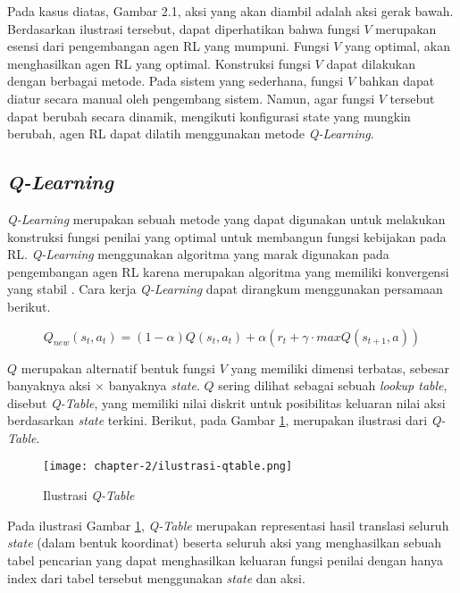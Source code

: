 Pada kasus diatas, Gambar 2.1, aksi yang akan diambil adalah aksi gerak bawah. Berdasarkan ilustrasi tersebut, dapat diperhatikan bahwa fungsi \(V\) merupakan esensi dari pengembangan agen \ac{RL} yang mumpuni. Fungsi \(V\) yang optimal, akan menghasilkan agen \ac{RL} yang optimal. Konstruksi fungsi \(V\) dapat dilakukan dengan berbagai metode. Pada sistem yang sederhana, fungsi \(V\) bahkan dapat diatur secara manual oleh pengembang sistem. Namun, agar fungsi \(V\) tersebut dapat berubah secara dinamik, mengikuti konfigurasi state yang mungkin berubah, agen \ac{RL} dapat dilatih menggunakan metode \textit{Q-Learning}.

\subsection{\textit{Q-Learning}}
\textit{Q-Learning} merupakan sebuah metode yang dapat digunakan untuk melakukan konstruksi fungsi penilai yang optimal untuk membangun fungsi kebijakan pada \ac{RL}. \textit{Q-Learning} menggunakan algoritma yang marak digunakan pada pengembangan agen \ac{RL} karena merupakan algoritma yang memiliki konvergensi yang stabil \parencite{lim2022regularized}. Cara kerja \textit{Q-Learning} dapat dirangkum menggunakan persamaan berikut.

\begin{equation}
	\label{eq:q-learning}
	Q_{new}(s_t,a_t) = (1-\alpha) Q(s_t, a_t) + \alpha (r_t + \gamma \cdot maxQ(s_{t+1},a))
\end{equation}

\(Q\) merupakan alternatif bentuk fungsi \(V\) yang memiliki dimensi terbatas, sebesar banyaknya aksi \(\times\) banyaknya \textit{state}. \(Q\) sering dilihat sebagai sebuah \textit{lookup table}, disebut \textit{Q-Table}, yang memiliki nilai diskrit untuk posibilitas keluaran nilai aksi berdasarkan \textit{state} terkini. Berikut, pada Gambar \ref{fig:ilustrasi-qtable}, merupakan ilustrasi dari \textit{Q-Table}.

\begin{figure}[h]
	\centering
	\texttt{[image: chapter-2/ilustrasi-qtable.png]}
	\caption{Ilustrasi \textit{Q-Table}}
	\label{fig:ilustrasi-qtable}
\end{figure}

Pada ilustrasi Gambar \ref{fig:ilustrasi-qtable}, \textit{Q-Table} merupakan representasi hasil translasi seluruh \textit{state} (dalam bentuk koordinat) beserta seluruh aksi yang menghasilkan sebuah tabel pencarian yang dapat menghasilkan keluaran fungsi penilai dengan hanya index dari tabel tersebut menggunakan \textit{state} dan aksi.

